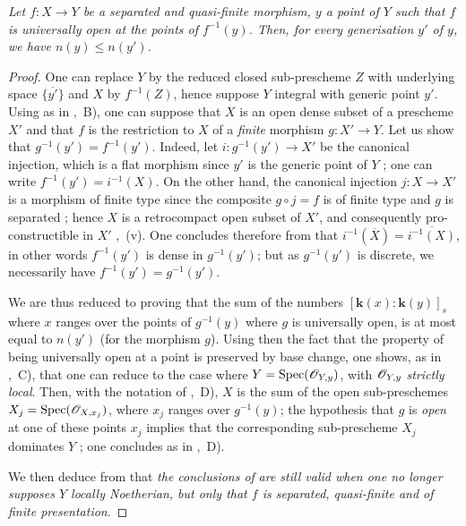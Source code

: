 \begin{env}[18.10.17.1]
\label{IV.18.10.17.1}
\emph{Let $f:X\to Y$ be a separated and quasi-finite morphism, $y$ a point of $Y$ such that $f$ is universally open at the points of $f^{-1}(y)$.
Then, for every generisation $y'$ of $y$, we have $n(y)\leq n(y')$.}
\end{env}

\begin{proof}
One can replace $Y$ by the reduced closed sub-prescheme $Z$ with underlying space $\overline{\{y'\}}$ and $X$ by $f^{-1}(Z)$, hence suppose $Y$ integral with generic point $y'$.
Using  as in ,~B), one can suppose that $X$ is an open dense subset of a prescheme $X'$ and that $f$ is the restriction to $X$ of a \emph{finite} morphism $g:X'\to Y$.
Let us show that $g^{-1}(y')=f^{-1}(y')$.
Indeed, let $i:g^{-1}(y')\to X'$ be the canonical injection, which is a flat morphism since $y'$ is the generic point of $Y$ ; one can write $f^{-1}(y')=i^{-1}(X)$.
On the other hand, the canonical injection $j:X\to X'$ is a morphism of finite type since the composite $g\circ j=f$ is of finite type and $g$ is separated ; hence $X$ is a retrocompact open subset of $X'$, and consequently pro-constructible in $X'$ ,~(v).
One concludes therefore from  that $i^{-1}(\overline{X})=\overline{i^{-1}(X)}$, in other words $f^{-1}(y')$ is dense in $g^{-1}(y')$; but as $g^{-1}(y')$ is discrete, we necessarily have $f^{-1}(y')=g^{-1}(y')$.

We are thus reduced to proving that the sum of the numbers $[\boldsymbol{k}(x):\boldsymbol{k}(y)]_s$ where $x$ ranges over the points of $g^{-1}(y)$ where $g$ is universally open, is at most equal to
$n(y')$ (for the morphism $g$).
Using then the fact that the property of being universally open at a point is preserved by base change, one shows, as in ,~C), that one can reduce to the case where $Y=\operatorname{Spec}(\mathscr{O}_{Y,y})$, with $\mathscr{O}_{Y,y}$ \emph{strictly local}.
Then, with the notation of ,~D), $X$ is the sum of the open sub-preschemes $X_j=\operatorname{Spec}(\mathscr{O}_{X,x_j})$, where $x_j$ ranges over $g^{-1}(y)$; the hypothesis that $g$ is \emph{open} at one of these points $x_j$ implies that the corresponding sub-prescheme $X_j$ dominates $Y$ ; one concludes as in ,~D).

We then deduce from  that \emph{the conclusions of}  \emph{are still valid when one no longer supposes $Y$ locally Noetherian, but only that $f$ is separated, quasi-finite and of finite presentation}.
\end{proof}

